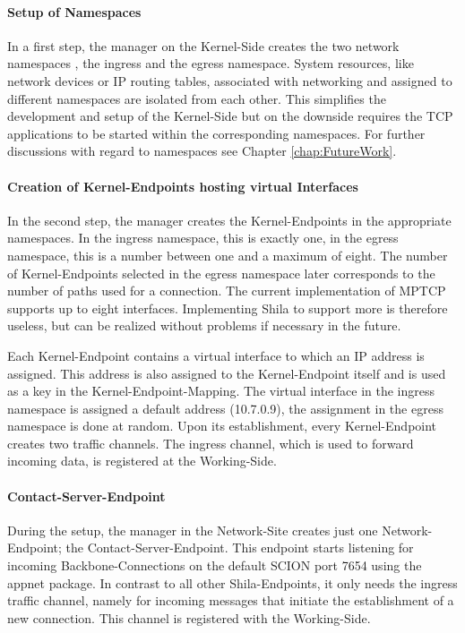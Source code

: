 \paragraph{Setup of Namespaces}

In a first step, the manager on the Kernel-Side creates the two network namespaces \cite{LinuxNetworkNamespacesUbuntuManual,LinuxNetworkNamespacesIntroduction}, the ingress and the egress namespace. System resources, like network devices or IP routing tables, associated with networking and assigned to different namespaces are isolated from each other. This simplifies the development and setup of the Kernel-Side but on the downside requires the TCP applications to be started within the corresponding namespaces. For further discussions with regard to namespaces see Chapter \ref{chap:FutureWork}.

\paragraph{Creation of Kernel-Endpoints hosting virtual Interfaces}

In the second step, the manager creates the Kernel-Endpoints in the appropriate namespaces. In the ingress namespace, this is exactly one, in the egress namespace, this is a number between one and a maximum of eight. The number of Kernel-Endpoints selected in the egress namespace later corresponds to the number of paths used for a connection. The current implementation of MPTCP supports up to eight interfaces. Implementing Shila to support more is therefore useless, but can be realized without problems if necessary in the future.

Each Kernel-Endpoint contains a virtual interface to which an IP address is assigned. This address is also assigned to the Kernel-Endpoint itself and is used as a key in the Kernel-Endpoint-Mapping. The virtual interface in the ingress namespace is assigned a default address ({\footnotesize 10.7.0.9}), the assignment in the egress namespace is done at random. Upon its establishment, every Kernel-Endpoint creates two traffic channels. The ingress channel, which is used to forward incoming data, is registered at the Working-Side. 

\paragraph{Contact-Server-Endpoint}

During the setup, the manager in the Network-Site creates just one Network-Endpoint; the Contact-Server-Endpoint. This endpoint starts listening for incoming Backbone-Connections on the default SCION port {\footnotesize 7654} using the appnet package. In contrast to all other Shila-Endpoints, it only needs the ingress traffic channel, namely for incoming messages that initiate the establishment of a new connection. This channel is registered with the Working-Side.

